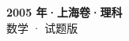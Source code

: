 \documentclass[zihao=-4, a4paper]{ctexart}
\begin{document}
\begin{center}
  {\Large\bfseries 2005 年·上海卷·理科}\\[4pt]
  {\large 数学 · 试题版}
\end{center}
\medskip
{}

\end{document}
